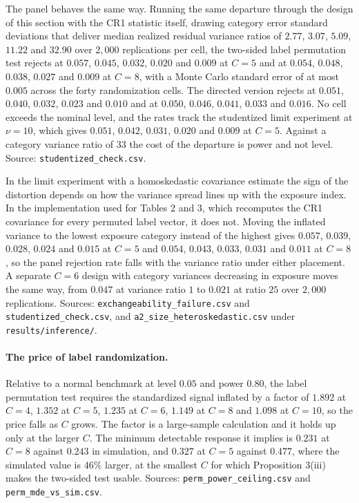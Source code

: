\documentclass[12pt]{article}
\theoremstyle{definition}
\numberwithin{equation}{section}
\begin{document}
The panel behaves the same way. Running the same departure through the design of
this section with the CR1 statistic itself, drawing category error standard
deviations that deliver median realized residual variance ratios of $2.77$,
$3.07$, $5.09$, $11.22$ and $32.90$ over $2{,}000$ replications per cell, the
two-sided label permutation test rejects at $0.057$, $0.045$, $0.032$, $0.020$
and $0.009$ at $C = 5$ and at $0.054$, $0.048$, $0.038$, $0.027$ and $0.009$ at
$C = 8$, with a Monte Carlo standard error of at most $0.005$ across the forty
randomization cells. The directed
version rejects at $0.051$, $0.040$, $0.032$, $0.023$ and $0.010$ and at
$0.050$, $0.046$, $0.041$, $0.033$ and $0.016$. No cell exceeds the nominal
level, and the rates track the studentized limit experiment at $\nu = 10$, which
gives $0.051$, $0.042$, $0.031$, $0.020$ and $0.009$ at $C = 5$. Against a
category variance ratio of $33$ the cost of the departure is power and not
level. Source: \texttt{studentized\_check.csv}.

In the limit experiment with a homoskedastic covariance estimate the sign of
the distortion depends on how the variance spread lines up with the exposure
index. In the implementation used for Tables 2 and
3, which recomputes the CR1 covariance for every permuted label
vector, it does not. Moving the inflated variance to the lowest exposure
category instead of the highest gives $0.057$, $0.039$, $0.028$, $0.024$ and
$0.015$ at $C = 5$ and $0.054$, $0.043$, $0.033$, $0.031$ and $0.011$ at
$C = 8$, so the panel rejection rate falls with the variance ratio under either
placement. A separate $C = 6$ design with category variances decreasing in
exposure moves the same way, from $0.047$ at variance ratio $1$ to $0.021$ at
ratio $25$ over $2{,}000$ replications. Sources:
\texttt{exchangeability\_failure.csv} and \texttt{studentized\_check.csv}, and
\texttt{a2\_size\_heteroskedastic.csv} under
\texttt{results/inference/}.

\paragraph{The price of label randomization.} Relative to a normal benchmark
at level $0.05$ and power $0.80$, the label permutation test requires the
standardized signal inflated by a factor of $1.892$ at $C = 4$, $1.352$ at
$C = 5$, $1.235$ at $C = 6$, $1.149$ at $C = 8$ and $1.098$ at $C = 10$, so the
price falls as $C$ grows. The factor is a large-sample calculation and it
holds up only at the larger $C$. The minimum detectable response it implies is
$0.231$ at $C = 8$ against $0.243$ in simulation, and $0.327$ at $C = 5$
against $0.477$, where the simulated value is $46\%$ larger, at the smallest
$C$ for which Proposition 3(iii) makes the two-sided test
usable.
Sources: \texttt{perm\_power\_ceiling.csv} and
\texttt{perm\_mde\_vs\_sim.csv}.
\end{document}
